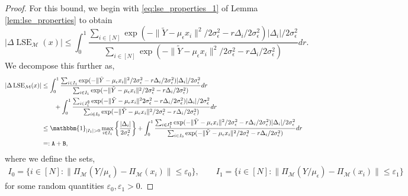 \documentclass[10pt]{article}
\theoremstyle{plain}
\theoremstyle{definition}
\theoremstyle{remark}
\newcommand{\M}{{\mathcal{M}}}
\newcommand{\lse}{\operatorname{LSE}}
\begin{document}
\begin{proof}
For this bound, we begin with \eqref{eq:lse_properties_1} of Lemma \ref{lem:lse_properties} to obtain
\begin{equation*}
    | \Delta \lse_\M(x) | \leq \int_0^1 \frac{\sum_{i \in [N]} \exp(-\|\tilde{Y} - \mu_\epsilon x_i\|^2/2\sigma_\epsilon^2-r\Delta_i/2\sigma_\epsilon^2) |\Delta_i|/2\sigma_\epsilon^2}{\sum_{i \in [N]} \exp(-\|\tilde{Y} - \mu_\epsilon x_i\|^2/2\sigma_\epsilon^2-r\Delta_i/2\sigma_\epsilon^2)} dr.
\end{equation*}
We decompose this further as,
\begin{align*}
    | \Delta \lse_\M(x) | &\leq \int_0^1 \frac{\sum_{i \in I_1} \exp(-\|\tilde{Y} - \mu_\epsilon x_i\|^2/2\sigma_\epsilon^2-r\Delta_i/2\sigma_\epsilon^2) |\Delta_i|/2\sigma_\epsilon^2}{\sum_{i \in I_1} \exp(-\|\tilde{Y} - \mu_\epsilon x_i\|^2/2\sigma_\epsilon^2-r\Delta_i/2\sigma_\epsilon^2)} dr\\
    & \qquad + \int_0^1 \frac{\sum_{i \in I_1^\complement} \exp(-\|\tilde{Y} - \mu_\epsilon x_i\|^22\sigma_\epsilon^2-r\Delta_i/2\sigma_\epsilon^2) |\Delta_i|/2\sigma_\epsilon^2}{\sum_{i \in I_0} \exp(-\|\tilde{Y} - \mu_\epsilon x_i\|^2/2\sigma_\epsilon^2-r\Delta_i/2\sigma_\epsilon^2)} dr \\
    &\leq \mathbbm{1}_{|I_1| > 0} \max_{i \in I_{1}} \bigg \{ \frac{|\Delta_i|}{2\sigma_\epsilon^2} \bigg \} + \int_0^1 \frac{\sum_{i \in I_{1}^\complement} \exp(-\|\tilde{Y} - \mu_\epsilon x_i\|^2/2\sigma_\epsilon^2-r\Delta_i/2\sigma_\epsilon^2) |\Delta_i|/2\sigma_\epsilon^2}{\sum_{i \in I_0} \exp(-\|\tilde{Y} - \mu_\epsilon x_i\|^2/2\sigma_\epsilon^2-r\Delta_i/2\sigma_\epsilon^2)} dr \\
    &=: \mathtt{A} + \mathtt{B},
\end{align*}
where we define the sets,
\begin{gather*}
    I_0 = \{i \in [N]: \|\Pi_\M(Y/\mu_\epsilon) - \Pi_\M(x_i)\| \leq \varepsilon_0\}, \qquad I_1 = \{i \in [N]: \|\Pi_\M(Y/\mu_\epsilon) - \Pi_\M(x_i)\| \leq \varepsilon_1\}
\end{gather*}
for some random quantities \(\varepsilon_0, \varepsilon_1 > 0\).


\end{proof}
\end{document}
